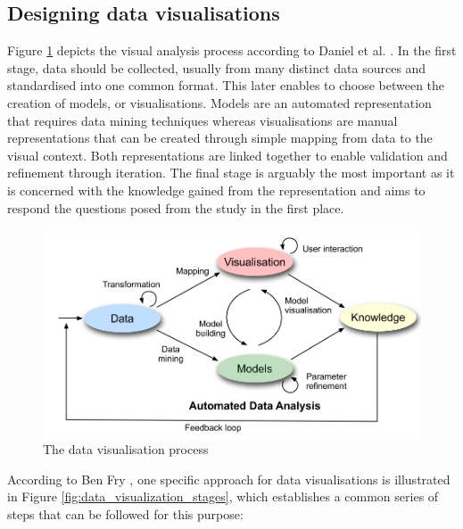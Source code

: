 \subsection{Designing data visualisations}
Figure \ref{fig:data_visualization_process} depicts the visual analysis process according to Daniel et al. \cite{KeimDaniel2010}. In the first stage,  data should be collected, usually from many distinct data sources and standardised into one common format. This later enables to choose between the creation of models, or visualisations. Models are an automated representation that requires data mining techniques whereas visualisations are manual representations that can be created through simple mapping from data to the visual context. Both representations are linked together to enable validation and refinement through iteration. The final stage is arguably the most important as it is concerned with the knowledge gained from the representation and aims to respond the questions posed from the study in the first place.
\begin{figure}[!htb]
\begin{adjustbox}{width=1\textwidth,center=\textwidth}
  \centering

\includegraphics[scale=1]{images/data_visualization_process.png}
\end{adjustbox}
  \caption[The data visualisation process]{The data visualisation process \cite{KeimDaniel2010} }
  \label{fig:data_visualization_process}
\end{figure}

According to Ben Fry \cite{Cleveland1993}, one specific approach for data visualisations is illustrated in Figure \ref{fig:data_visualization_stages}, which establishes a common series of steps that can be followed for this purpose:

